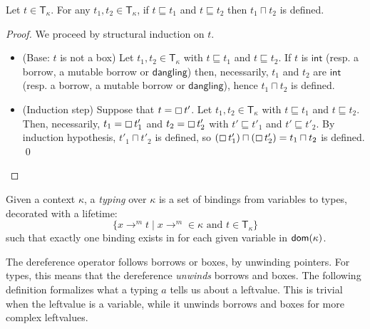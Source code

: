 \begin{lemma}\label{lemma:technical-type}
  Let $t\in\mathsf{T}_\kappa$. For any $t_1,t_2\in\mathsf{T}_\kappa$,
  if $t\sqsubseteq t_1$ and $t\sqsubseteq t_2$ then $t_1\sqcap t_2$ is defined.
\end{lemma}
\begin{proof}
  We proceed by structural induction on $t$.
  \begin{itemize}
    \item (Base: $t$ is not a box)
    Let $t_1,t_2\in\mathsf{T}_\kappa$ with $t\sqsubseteq t_1$ and $t\sqsubseteq t_2$.
    If $t$ is $\mathsf{int}$ (resp. a borrow, a mutable borrow or $\mathsf{dangling}$)
    then, necessarily, $t_1$ and $t_2$ are $\mathsf{int}$ (resp. a borrow,
    a mutable borrow or $\mathsf{dangling}$), hence $t_1\sqcap t_2$ is defined.
    \item (Induction step) Suppose that $t = \boxempty\,{t'}$.
    Let $t_1,t_2\in\mathsf{T}_\kappa$ with $t\sqsubseteq t_1$ and $t\sqsubseteq t_2$.
    Then, necessarily, $t_1 = \boxempty\,{t'_1}$ and $t_2 = \boxempty\,{t'_2}$
    with $t'\sqsubseteq t'_1$ and $t'\sqsubseteq t'_2$. By induction
    hypothesis, $t'_1\sqcap t'_2$ is defined, so
    $(\boxempty\,{t'_1}) \sqcap (\boxempty\,{t'_2}) = t_1 \sqcap t_2$ is defined.
    \qed
  \end{itemize}
\end{proof}

\begin{definition}[Typing]\label{def:typing}
  Given a context $\kappa$, a \emph{typing} over $\kappa$ is
  a set of bindings from variables to types, decorated with a lifetime:
  \[
  \{x\to^m t\mid x\to^m\in\kappa\text{ and }t\in\mathsf{T_\kappa}\}
  \]
  such that exactly one binding exists in for each given variable in $\mathsf{dom}(\kappa)$.
\end{definition}

The dereference operator follows borrows or boxes, by unwinding pointers.
For types, this means that the dereference \emph{unwinds} borrows and boxes.
The following definition formalizes what a typing $a$ tells us about
a leftvalue. This is trivial when the leftvalue is a variable,
while it unwinds borrows and boxes for more complex leftvalues.

